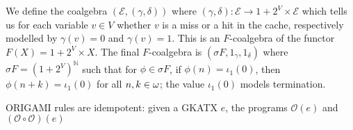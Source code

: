 We define the coalgebra $(\mathscr{E}, (\gamma,\delta))$ where $(\gamma,\delta)\colon \mathscr{E}\rightarrow 1+2^V\times \mathscr{E}$ which tells us for each variable $v\in V$ whether $v$ is a miss or a hit in the cache, respectively modelled by $\gamma(v)=0$ and $\gamma(v)=1$. This is an $F$-coalgebra of the functor $F(X)=1+2^V\times X$. The final $F$-coalgebra is $(\sigma F,1_\gamma, 1_\delta)$ where $\sigma F = (1+2^V)^\mathbb{N}$ such that for $\phi\in \sigma F$, if $\phi(n)=\iota_1(0)$, then $\phi(n+k)=\iota_1(0)$ for all $n,k\in {\omega}$; the value $\iota_1(0)$ models termination. 







ORIGAMI rules are idempotent: given a GKATX $e$, the programs $\mathscr{O}(e)$ and $(\mathscr{O}\circ\mathscr{O})(e)$

